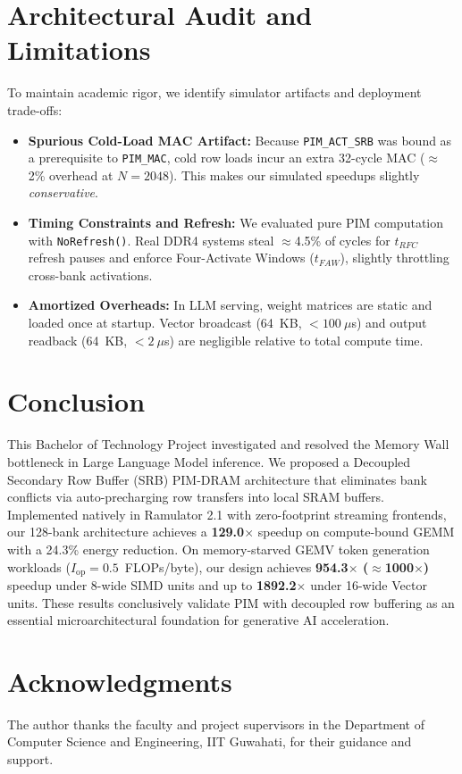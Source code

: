 \documentclass[10pt,twocolumn]{article}
\begin{document}
\section{Architectural Audit and Limitations}
\label{sec:audit}
To maintain academic rigor, we identify simulator artifacts and deployment trade-offs:
\begin{itemize}
    \item \textbf{Spurious Cold-Load MAC Artifact:} Because \texttt{PIM\_ACT\_SRB} was bound as a prerequisite to \texttt{PIM\_MAC}, cold row loads incur an extra 32-cycle MAC ($\approx$2\% overhead at $N=2048$). This makes our simulated speedups slightly \textit{conservative}.
    \item \textbf{Timing Constraints and Refresh:} We evaluated pure PIM computation with \texttt{NoRefresh()}. Real DDR4 systems steal $\approx$4.5\% of cycles for $t_{RFC}$ refresh pauses and enforce Four-Activate Windows ($t_{FAW}$), slightly throttling cross-bank activations.
    \item \textbf{Amortized Overheads:} In LLM serving, weight matrices are static and loaded once at startup. Vector broadcast (64~KB, $<100\ \mu$s) and output readback (64~KB, $<2\ \mu$s) are negligible relative to total compute time.
\end{itemize}

\section{Conclusion}
\label{sec:conclusion}
This Bachelor of Technology Project investigated and resolved the Memory Wall bottleneck in Large Language Model inference. We proposed a Decoupled Secondary Row Buffer (SRB) PIM-DRAM architecture that eliminates bank conflicts via auto-precharging row transfers into local SRAM buffers. Implemented natively in Ramulator 2.1 with zero-footprint streaming frontends, our 128-bank architecture achieves a \textbf{129.0$\times$} speedup on compute-bound GEMM with a 24.3\% energy reduction. On memory-starved GEMV token generation workloads ($I_{\text{op}} = 0.5$~FLOPs/byte), our design achieves \textbf{954.3$\times$ ($\approx$1000$\times$)} speedup under 8-wide SIMD units and up to \textbf{1892.2$\times$} under 16-wide Vector units. These results conclusively validate PIM with decoupled row buffering as an essential microarchitectural foundation for generative AI acceleration.

\section*{Acknowledgments}
The author thanks the faculty and project supervisors in the Department of Computer Science and Engineering, IIT Guwahati, for their guidance and support.
\end{document}

